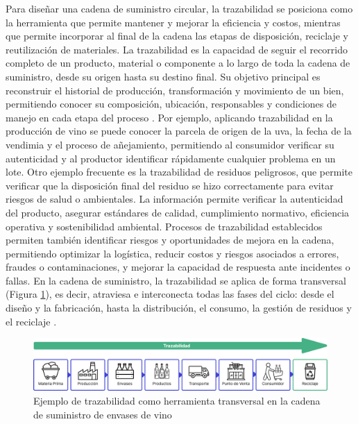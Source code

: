 Para diseñar una cadena de suministro circular, la \gls{trazabilidad} se posiciona como la herramienta que permite mantener y mejorar la eficiencia y costos, mientras que permite incorporar al final de la cadena las etapas de disposición, reciclaje y reutilización de materiales. La trazabilidad es la capacidad de seguir el recorrido completo de un producto, material o componente a lo largo de toda la cadena de suministro, desde su origen hasta su destino final. Su objetivo principal es reconstruir el historial de producción, transformación y movimiento de un bien, permitiendo conocer su composición, ubicación, responsables y condiciones de manejo en cada etapa del proceso \cite{bartolomeo2020introduccion}. Por ejemplo, aplicando trazabilidad en la producción de vino se puede conocer la parcela de origen de la uva, la fecha de la vendimia y el proceso de añejamiento, permitiendo al consumidor verificar su autenticidad y al productor identificar rápidamente cualquier problema en un lote. Otro ejemplo frecuente es la trazabilidad de residuos peligrosos, que permite verificar que la disposición final del residuo se hizo correctamente para evitar riesgos de salud o ambientales. La información permite verificar la autenticidad del producto, asegurar estándares de calidad, cumplimiento normativo, eficiencia operativa y \gls{sostenibilidad} ambiental. Procesos de trazabilidad establecidos permiten también identificar riesgos y oportunidades de mejora en la cadena, permitiendo optimizar la logística, reducir costos y riesgos asociados a errores, fraudes o contaminaciones, y mejorar la capacidad de respuesta ante incidentes o fallas. En la cadena de suministro, la trazabilidad se aplica de forma transversal (Figura \ref{fig:supply-chain-traceability}), es decir, atraviesa e interconecta todas las fases del ciclo: desde el diseño y la fabricación, hasta la distribución, el consumo, la gestión de residuos y el reciclaje \cite{cepal2021economia}.

\begin{figure}[!tb]
    \centering
    \includegraphics[width=\textwidth]{Figures/supply-chain-traceability.png}
    \caption{Ejemplo de trazabilidad como herramienta transversal en la cadena de suministro de envases de vino}
    \label{fig:supply-chain-traceability}
\end{figure}

